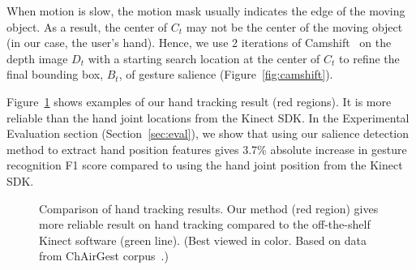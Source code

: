 When motion is slow, the motion mask usually indicates the edge of the moving
object. As a result, the center of $C_t$ may not be the center of the moving
object (in our case, the user's hand). Hence, we use 2 iterations of Camshift~\cite{Bradski98} on
the depth image $D_t$ with a starting search location at the center of $C_t$ to refine
the final bounding box, $B_t$, of gesture salience (Figure~\ref{fig:camshift}).

Figure~\ref{fig:compare-skeleton} shows examples of our hand tracking result (red regions).
It is more reliable than the hand joint locations from the Kinect SDK. In the
Experimental Evaluation section (Section~\ref{sec:eval}), we show that using our
salience detection method to extract hand position features gives 3.7\%
absolute increase in gesture recognition F1 score compared to using the hand
joint position from the Kinect SDK.

\begin{figure}
\centering
{}
\caption{Comparison of hand tracking results. Our method (red region) gives more
reliable result on hand tracking compared to the off-the-shelf Kinect software
(green line). (Best viewed in color. Based on data from ChAirGest
corpus~\cite{Ruffieux2013}.)}
\label{fig:compare-skeleton}
\end{figure}


